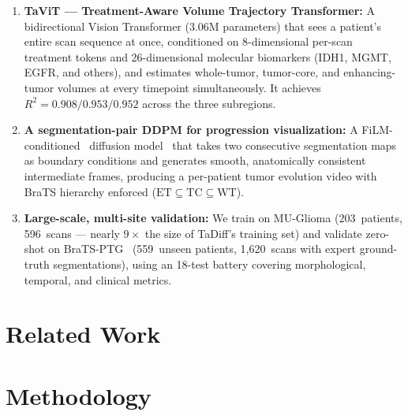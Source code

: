 \documentclass[conference]{IEEEtran}
\begin{document}
\begin{enumerate}

  \item \textbf{TaViT --- Treatment-Aware Volume Trajectory Transformer:}
    A bidirectional Vision Transformer (3.06M parameters) that sees a patient's
    entire scan sequence at once, conditioned on 8-dimensional per-scan
    treatment tokens and 26-dimensional molecular biomarkers (IDH1, MGMT, EGFR,
    and others), and estimates whole-tumor, tumor-core, and enhancing-tumor
    volumes at every timepoint simultaneously. It achieves
    $R^2 = 0.908/0.953/0.952$ across the three subregions.

  \item \textbf{A segmentation-pair DDPM for progression visualization:}
    A FiLM-conditioned~\cite{perez2018film} diffusion model~\cite{ho2020ddpm}
    that takes two consecutive segmentation maps as boundary conditions and
    generates smooth, anatomically consistent intermediate frames, producing a
    per-patient tumor evolution video with BraTS hierarchy enforced
    ($\text{ET} \subseteq \text{TC} \subseteq \text{WT}$).

  \item \textbf{Large-scale, multi-site validation:}
    We train on MU-Glioma (203~patients, 596~scans --- nearly $9\times$ the
    size of TaDiff's training set) and validate zero-shot on
    BraTS-PTG~\cite{deverdier2024bratsptg} (559~unseen patients, 1,620~scans
    with expert ground-truth segmentations), using an 18-test battery covering
    morphological, temporal, and clinical metrics.

\end{enumerate}


\section{Related Work}



\section{Methodology}
\label{sec:methodology}
\end{document}
